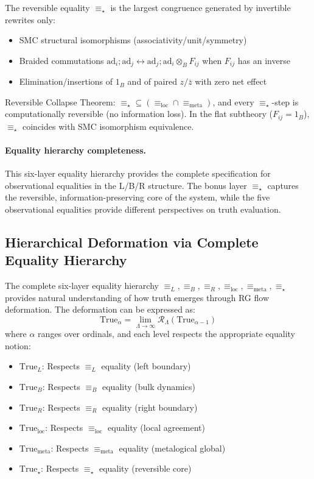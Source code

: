 \begin{definition}
\label{def:reversible-equality}
The reversible equality $\equiv_\star$ is the largest congruence generated by invertible rewrites only:
\begin{itemize}
\item SMC structural isomorphisms (associativity/unit/symmetry)
\item Braided commutations $\text{ad}_i; \text{ad}_j \leftrightarrow \text{ad}_j; \text{ad}_i \otimes_B F_{ij}$ when $F_{ij}$ has an inverse
\item Elimination/insertions of $1_B$ and of paired $z/\bar{z}$ with zero net effect
\end{itemize}

Reversible Collapse Theorem: $\equiv_\star \subseteq (\equiv_{\text{loc}} \cap \equiv_{\text{meta}})$, and every $\equiv_\star$-step is computationally reversible (no information loss). In the flat subtheory ($F_{ij} = 1_B$), $\equiv_\star$ coincides with SMC isomorphism equivalence.
\end{definition}

\paragraph{Equality hierarchy completeness.} This six-layer equality hierarchy provides the complete specification for observational equalities in the L/B/R structure. The bonus layer $\equiv_\star$ captures the reversible, information-preserving core of the system, while the five observational equalities provide different perspectives on truth evaluation.

\subsection{Hierarchical Deformation via Complete Equality Hierarchy}

The complete six-layer equality hierarchy $\equiv_L, \equiv_B, \equiv_R, \equiv_{\text{loc}}, \equiv_{\text{meta}}, \equiv_\star$ provides natural understanding of how truth emerges through RG flow deformation. The deformation can be expressed as:
\[
\text{True}_\alpha = \lim_{\Lambda \to \infty} \mathcal{R}_\Lambda(\text{True}_{\alpha-1})
\]
where $\alpha$ ranges over ordinals, and each level respects the appropriate equality notion:
\begin{itemize}
\item $\text{True}_L$: Respects $\equiv_L$ equality (left boundary)
\item $\text{True}_B$: Respects $\equiv_B$ equality (bulk dynamics)
\item $\text{True}_R$: Respects $\equiv_R$ equality (right boundary)
\item $\text{True}_{\text{loc}}$: Respects $\equiv_{\text{loc}}$ equality (local agreement)
\item $\text{True}_{\text{meta}}$: Respects $\equiv_{\text{meta}}$ equality (metalogical global)
\item $\text{True}_\star$: Respects $\equiv_\star$ equality (reversible core)
\end{itemize}

